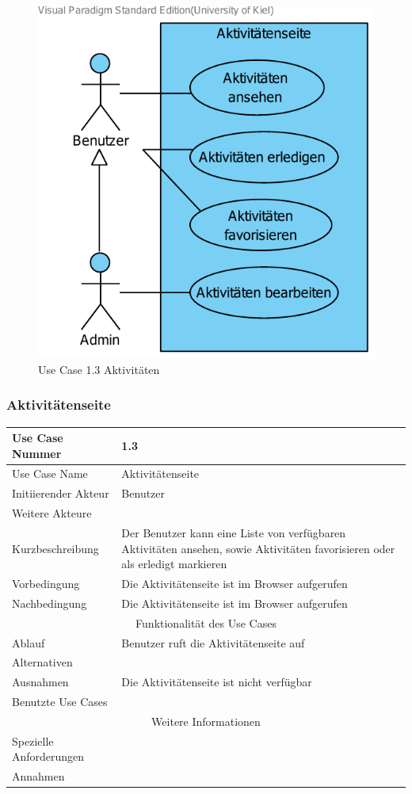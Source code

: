 \documentclass[10pt,a4paper]{article}
\begin{document}
	\begin{figure}[H]
	\centering
		\includegraphics[width=\linewidth]{gfx/webseite/Aktivitaetenseite.pdf}
		\caption{Use Case 1.3 Aktivit\"aten}
	\end{figure}
	\subsubsection{Aktivit\"atenseite}
	\begin{tabularx}{\textwidth}{|l|X|}
	\hline Use Case Nummer & 1.3 \\ 
	\hline Use Case Name & Aktivit\"atenseite \\ 
	\hline Initiierender Akteur & Benutzer \\
	\hline Weitere Akteure & \\
	\hline Kurzbeschreibung & Der Benutzer kann eine Liste von verf\"ugbaren Aktivit\"aten ansehen, sowie Aktivit\"aten favorisieren oder als erledigt markieren \\
	\hline Vorbedingung & Die Aktivit\"atenseite ist im Browser aufgerufen \\
	\hline Nachbedingung & Die Aktivit\"atenseite ist im Browser aufgerufen \\
	\hline \multicolumn{2}{|c|}{Funktionalität des Use Cases}\\
	\hline Ablauf & Benutzer ruft die Aktivit\"atenseite auf \\
	\hline Alternativen & \\
	\hline Ausnahmen & Die Aktivit\"atenseite ist nicht verf\"ugbar \\
	\hline Benutzte Use Cases & \\
	\hline \multicolumn{2}{|c|}{Weitere Informationen} \\
	\hline Spezielle Anforderungen & \\
	\hline Annahmen & \\
	\hline
	\end{tabularx} 
\end{document}
